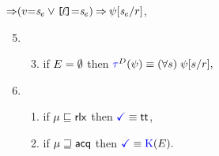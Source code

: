 \begin{minipage}[t]{\textwidth}
\begin{minipage}[t]{.44\textwidth}
\begin{enumerate}[topsep=0pt,label=(\textsc{r}\arabic*),ref=\textsc{r}\arabic*]
\begin{enumerate}[leftmargin=0pt]
{\begin{math}
{            \mathbin{\Rightarrow}(v{=}\mathit{s}_{e} \lor \mkern-0mu\texttt{[}\mkern-2mu\ell\mkern-2mu\texttt{]}\mkern-0mu{=}\mathit{s}_{e})
          }
          \mathbin{\Rightarrow}
          \psi[\mathit{s}_{e}/r]
        \end{math},}
    \end{enumerate}
  \end{enumerate}
\end{minipage}
\begin{minipage}[t]{.56\textwidth}
  \begin{enumerate}[topsep=0pt,label=(\textsc{r}\arabic*),ref=\textsc{r}\arabic*]
    \setcounter{enumi}{4}
  \item[] 
    \begin{enumerate}[leftmargin=0pt]
      \setcounter{enumii}{2}
    \item \label{read-tau-empty-addr}
      if $E=\emptyset$ then 
      \begin{math}
        \aTr{\bEvs}{\bForm} \riff 
        (\forall\bReg)\;
        \bForm[\bReg/\aReg],
      \end{math}  
    \end{enumerate}
  \item[] 
    \begin{enumerate}[leftmargin=0pt]
    \item \label{read-term-nonempty-addr}
      if $\mu\sqsubseteq{\mathsf{rlx}}$ then $\aTerm \riff \TRUE$,
    \item \label{read-term-empty-addr}
        if $\mu\sqsupseteq{\mathsf{acq}}$ then
        \begin{math}
          \aTerm \riff
          \kappaE{}. %
        \end{math}
    \end{enumerate}      
  \end{enumerate}
  \end{minipage}
\end{minipage}


